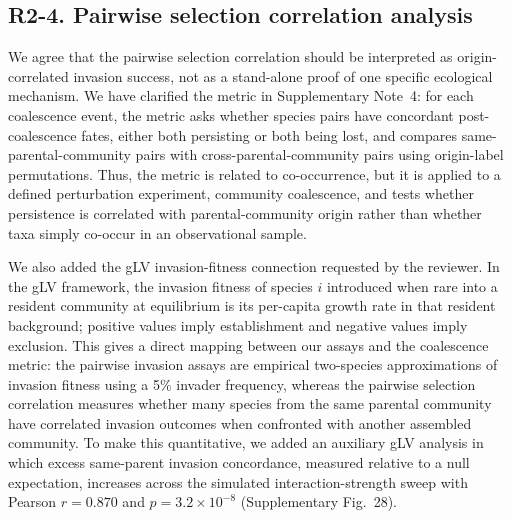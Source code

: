 \subsection*{R2-4. Pairwise selection correlation analysis}


We agree that the pairwise selection correlation should be interpreted as origin-correlated invasion success, not as a stand-alone proof of one specific ecological mechanism. We have clarified the metric in Supplementary Note~4: for each coalescence event, the metric asks whether species pairs have concordant post-coalescence fates, either both persisting or both being lost, and compares same-parental-community pairs with cross-parental-community pairs using origin-label permutations. Thus, the metric is related to co-occurrence, but it is applied to a defined perturbation experiment, community coalescence, and tests whether persistence is correlated with parental-community origin rather than whether taxa simply co-occur in an observational sample.

We also added the gLV invasion-fitness connection requested by the reviewer. In the gLV framework, the invasion fitness of species $i$ introduced when rare into a resident community at equilibrium is its per-capita growth rate in that resident background; positive values imply establishment and negative values imply exclusion. This gives a direct mapping between our assays and the coalescence metric: the pairwise invasion assays are empirical two-species approximations of invasion fitness using a 5\% invader frequency, whereas the pairwise selection correlation measures whether many species from the same parental community have correlated invasion outcomes when confronted with another assembled community. To make this quantitative, we added an auxiliary gLV analysis in which excess same-parent invasion concordance, measured relative to a null expectation, increases across the simulated interaction-strength sweep with Pearson $r = 0.870$ and $p = 3.2 \times 10^{-8}$ (Supplementary Fig.~28).

